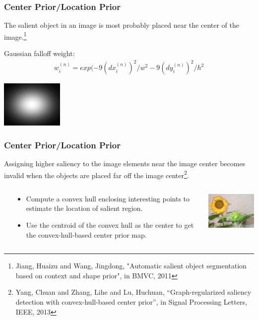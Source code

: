 \documentclass[notheorems,serif,table,compress]{beamer}  %
\begin{document}
\begin{frame}
\frametitle{{\color{magenta}} Center Prior/Location Prior}
{\color{blue}The salient object in an image is most probably placed near the center of the image.}\footnote{Jiang, Huaizu and Wang, Jingdong, "Automatic salient object segmentation based on context and shape prior", in BMVC, 2011}

\vspace{0.2in}

Gaussian falloff weight:
\begin{align}
w_i^{(n)} = exp(-9(dx_i^{(n)})^2/w^2-9(dy_i^{(n)})^2/h^2
\end{align}

\centering\includegraphics[width=3cm]{CBcolorPrior.png}
\end{frame}


\begin{frame}
\frametitle{{\color{magenta}} Center Prior/Location Prior}
Assigning higher saliency to the image elements near the image center becomes invalid when the objects are placed far off the image center\footnote{Yang, Chuan and Zhang, Lihe and Lu, Huchuan, ``Graph-regularized saliency detection with convex-hull-based center prior'', in Signal Processing Letters, IEEE, 2013}.
\begin{columns}
\begin{column}{\leftmargini}
\end{column}
\begin{column}{0.5\linewidth}
\begin{itemize}
\item Compute a convex hull enclosing interesting points to estimate the location of salient region.
\item Use the centroid of the convex hull as the center to get the convex-hull-based center prior map.
\end{itemize}
\end{column}
\begin{column}{0.5\linewidth}
\centering\includegraphics[width=4cm]{convexHull}
\end{column}
\end{columns}\vspace{1ex}
\end{frame}
\end{document}
